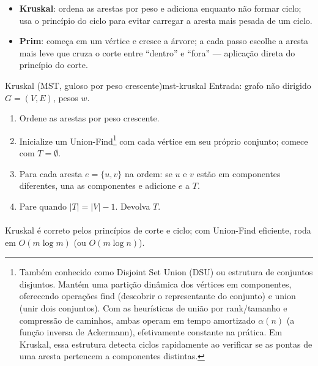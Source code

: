 \documentclass[12pt,a4paper]{article}
\def\texttt#1{#1}%
\def\emph#1{#1}%
\begin{document}
\begin{itemize}\setlength{\itemsep}{2pt}
    \item \textbf{Kruskal}: ordena as arestas por peso e adiciona enquanto não formar ciclo; usa o princípio do ciclo para evitar carregar a aresta mais pesada de um ciclo.
    \item \textbf{Prim}: começa em um vértice e cresce a árvore; a cada passo escolhe a aresta mais leve que cruza o corte entre “dentro” e “fora” — aplicação direta do princípio do corte.
\end{itemize}


\begin{algobox}{Kruskal (MST, guloso por peso crescente)}{mst-kruskal}
Entrada: grafo não dirigido \(G=(V,E)\), pesos \(w\).
\begin{enumerate}\setlength{\itemsep}{2pt}
    \item Ordene as arestas por peso crescente.
    \item Inicialize um \emph{Union-Find}\footnote{Também conhecido como \emph{Disjoint Set Union} (DSU) ou \emph{estrutura de conjuntos disjuntos}. Mantém uma partição dinâmica dos vértices em componentes, oferecendo operações \texttt{find} (descobrir o representante do conjunto) e \texttt{union} (unir dois conjuntos). Com as heurísticas de \emph{união por rank/tamanho} e \emph{compressão de caminhos}, ambas operam em tempo amortizado \(\alpha(n)\) (a função inversa de Ackermann), efetivamente constante na prática. Em Kruskal, essa estrutura detecta ciclos rapidamente ao verificar se as pontas de uma aresta pertencem a componentes distintas.} com cada vértice em seu próprio conjunto; comece com \(T=\emptyset\).
    \item Para cada aresta \(e=\{u,v\}\) na ordem: se \(u\) e \(v\) estão em componentes diferentes, una as componentes e adicione \(e\) a \(T\).
    \item Pare quando \(|T|=|V|-1\). Devolva \(T\).
\end{enumerate}
\end{algobox}

\paragraph{}Kruskal é correto pelos princípios de corte e ciclo; com Union-Find eficiente, roda em \(O(m\log m)\) (ou \(O(m\log n)\)).
\end{document}
